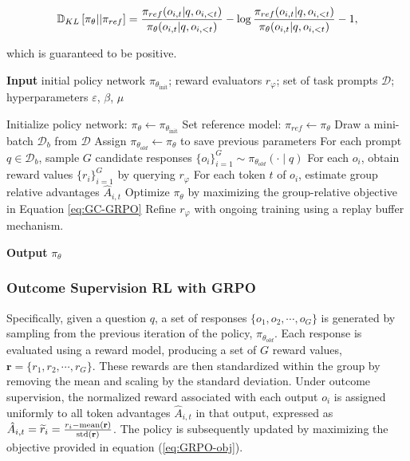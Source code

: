 \begin{itemize}[topsep=0pt]
\begin{itemize}[topsep=0pt]
\begin{equation}
\small
    \mathbb{D}_{KL}\left[\pi_{\theta} || \pi_{ref}\right] = \frac{\pi_{ref}(o_{i,t}|q,o_{i,<t})}{\pi_{\theta}(o_{i,t}|q,o_{i,<t})} - \log\frac{\pi_{ref}(o_{i,t}|q,o_{i,<t})}{\pi_{\theta}(o_{i,t}|q,o_{i,<t})} - 1,
\end{equation}

which is guaranteed to be positive.

\begin{algorithm}[t]
  \small
  \caption{Iterative Group Relative Policy Optimization}
  \textbf{Input} initial policy network $\pi_{\theta_{\text{init}}}$; reward evaluators $r_\varphi$; set of task prompts $\mathcal{D}$; 
  hyperparameters $\varepsilon$, $\beta$, $\mu$
  \begin{algorithmic}[1]
    \State Initialize policy network: $\pi_\theta \gets \pi_{\theta_{\text{init}}}$
       \State Set reference model: $\pi_{ref} \gets \pi_{\theta}$
      \State Draw a mini-batch $\mathcal{D}_b$ from $\mathcal{D}$
      \State Assign $\pi_{\theta_{old}} \gets \pi_\theta$ to save previous parameters
      \State For each prompt $q \in \mathcal{D}_b$, sample $G$ candidate responses $\{o_i\}_{i=1}^G \sim \pi_{\theta_{old}} (\cdot \mid q)$
      \State For each $o_i$, obtain reward values $\{r_i\}_{i=1}^{G}$ by querying $r_\varphi$
      \State For each token $t$ of $o_i$, estimate group relative advantages $\hat{A}_{i,t}$
        \State Optimize $\pi_\theta$ by maximizing the group-relative objective in Equation \ref{eq:GC-GRPO}
      \EndFor
    \EndFor 
    \State Refine $r_\varphi$ with ongoing training using a replay buffer mechanism. 
    \EndFor 
  \end{algorithmic}
  \textbf{Output} $\pi_\theta$
  \label{alg:iter-grpo}
\end{algorithm}

\subsubsection{Outcome Supervision RL with GRPO} Specifically, given a question $q$, a set of responses $\{o_1, o_2, \cdots, o_G\}$ is generated by sampling from the previous iteration of the policy, $\pi_{\theta_{old}}$. Each response is evaluated using a reward model, producing a set of $G$ reward values, $\mathbf{r} = \{r_1, r_2, \cdots, r_G\}$. These rewards are then standardized within the group by removing the mean and scaling by the standard deviation. Under outcome supervision, the normalized reward associated with each output $o_i$ is assigned uniformly to all token advantages $\hat{A}_{i, t}$ in that output, expressed as $\hat{A}_{i, t} = \widetilde{r}_i = \frac{r_i- {\rm mean}(\mathbf{r})}{{\rm std}(\mathbf{r})}$. The policy is subsequently updated by maximizing the objective provided in equation (\ref{eq:GRPO-obj}).


\end{itemize}
\end{itemize}
